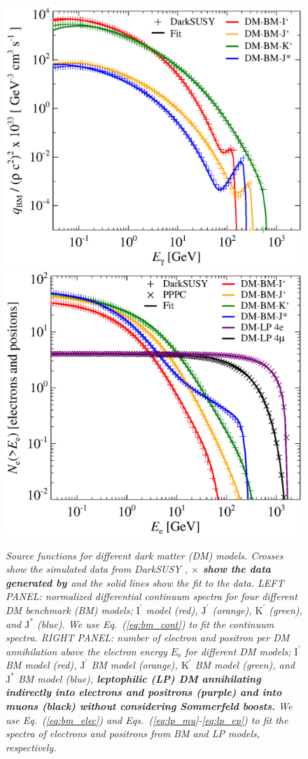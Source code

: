 \documentclass[10pt,aps,pra,reprint,amsmath,amsfonts,amssymb,showpacs,nofootinbib,floatfix]{revtex4-1}
\def\C#1{{\bf #1}}
\newcommand{\rmn}{\mathrm}
\newcommand{\ee}{E_\rmn{e}}
\newcommand{\Kp}{\rmn{K}^\prime}
\newcommand{\Ip}{\rmn{I}^\prime}
\newcommand{\Js}{\rmn{J}^*}
\newcommand{\Jp}{\rmn{J}^\prime}
\begin{document}
\begin{figure}
\begin{minipage}{2.0\columnwidth}
 \includegraphics[width=0.49\columnwidth]{figures/fit.ds.flux.eps}
 \includegraphics[width=0.49\columnwidth]{figures/fit.epflux.int.eps}
 \caption{\it Source functions for different dark matter (DM)
   models. Crosses show the simulated data from {\sc DarkSUSY}
   \cite{ds}, \C{$\times$ show the data generated by
     \protect\cite{2011JCAP...03..019C,2011JCAP...03..051C}} and the
   solid lines show the fit to the data. LEFT PANEL: normalized
   differential continuum spectra for four different DM benchmark (BM)
   models; $\Ip$ model (red), $\Jp$ (orange), $\Kp$ (green), and $\Js$
   (blue). We use Eq.~(\ref{eq:bm_cont}) to fit the continuum
   spectra. RIGHT PANEL: number of electron and positron per DM
   annihilation above the electron energy $\ee$ for different DM
   models; $\Ip$ BM model (red), $\Jp$ BM model (orange), $\Kp$ BM
   model (green), and $\Js$ BM model (blue), \C{leptophilic (LP) DM
   annihilating indirectly into electrons and positrons (purple) and
   into muons (black) without considering Sommerfeld boosts.} We use
   Eq.~(\ref{eq:bm_elec}) and Eqs.~(\ref{eq:lp_mu}-\ref{eq:lp_ep}) to
   fit the spectra of electrons and positrons from BM and LP models,
   respectively.}
 \label{fig:q_DM}
\end{minipage}
\end{figure}
\end{document}
